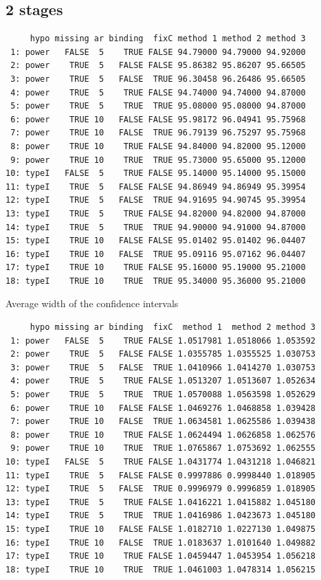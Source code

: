 \documentclass[12pt]{article}
\begin{document}
\subsection{2 stages}
\label{sec:org1de7605}
\begin{verbatim}
     hypo missing ar binding  fixC method 1 method 2 method 3
 1: power   FALSE  5    TRUE FALSE 94.79000 94.79000 94.92000
 2: power    TRUE  5   FALSE FALSE 95.86382 95.86207 95.66505
 3: power    TRUE  5   FALSE  TRUE 96.30458 96.26486 95.66505
 4: power    TRUE  5    TRUE FALSE 94.74000 94.74000 94.87000
 5: power    TRUE  5    TRUE  TRUE 95.08000 95.08000 94.87000
 6: power    TRUE 10   FALSE FALSE 95.98172 96.04941 95.75968
 7: power    TRUE 10   FALSE  TRUE 96.79139 96.75297 95.75968
 8: power    TRUE 10    TRUE FALSE 94.84000 94.82000 95.12000
 9: power    TRUE 10    TRUE  TRUE 95.73000 95.65000 95.12000
10: typeI   FALSE  5    TRUE FALSE 95.14000 95.14000 95.15000
11: typeI    TRUE  5   FALSE FALSE 94.86949 94.86949 95.39954
12: typeI    TRUE  5   FALSE  TRUE 94.91695 94.90745 95.39954
13: typeI    TRUE  5    TRUE FALSE 94.82000 94.82000 94.87000
14: typeI    TRUE  5    TRUE  TRUE 94.90000 94.91000 94.87000
15: typeI    TRUE 10   FALSE FALSE 95.01402 95.01402 96.04407
16: typeI    TRUE 10   FALSE  TRUE 95.09116 95.07162 96.04407
17: typeI    TRUE 10    TRUE FALSE 95.16000 95.19000 95.21000
18: typeI    TRUE 10    TRUE  TRUE 95.34000 95.36000 95.21000
\end{verbatim}

Average width of the confidence intervals
\begin{verbatim}
     hypo missing ar binding  fixC  method 1  method 2 method 3
 1: power   FALSE  5    TRUE FALSE 1.0517981 1.0518066 1.053592
 2: power    TRUE  5   FALSE FALSE 1.0355785 1.0355525 1.030753
 3: power    TRUE  5   FALSE  TRUE 1.0410966 1.0414270 1.030753
 4: power    TRUE  5    TRUE FALSE 1.0513207 1.0513607 1.052634
 5: power    TRUE  5    TRUE  TRUE 1.0570088 1.0563598 1.052629
 6: power    TRUE 10   FALSE FALSE 1.0469276 1.0468858 1.039428
 7: power    TRUE 10   FALSE  TRUE 1.0634581 1.0625586 1.039438
 8: power    TRUE 10    TRUE FALSE 1.0624494 1.0626858 1.062576
 9: power    TRUE 10    TRUE  TRUE 1.0765867 1.0753692 1.062555
10: typeI   FALSE  5    TRUE FALSE 1.0431774 1.0431218 1.046821
11: typeI    TRUE  5   FALSE FALSE 0.9997886 0.9998440 1.018905
12: typeI    TRUE  5   FALSE  TRUE 0.9996979 0.9996859 1.018905
13: typeI    TRUE  5    TRUE FALSE 1.0416221 1.0415882 1.045180
14: typeI    TRUE  5    TRUE  TRUE 1.0416986 1.0423673 1.045180
15: typeI    TRUE 10   FALSE FALSE 1.0182710 1.0227130 1.049875
16: typeI    TRUE 10   FALSE  TRUE 1.0183637 1.0101640 1.049882
17: typeI    TRUE 10    TRUE FALSE 1.0459447 1.0453954 1.056218
18: typeI    TRUE 10    TRUE  TRUE 1.0461003 1.0478314 1.056215
\end{verbatim}
\end{document}
